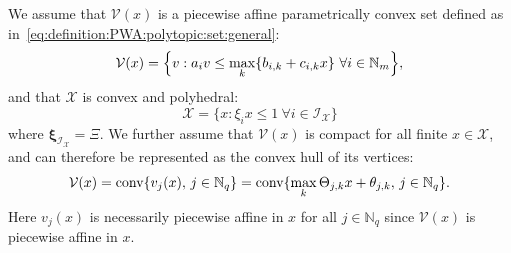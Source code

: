 \documentclass[journal]{IEEEtran}
\newcommand{\todo}[2]{%
  \providetoggle{#1}%
    \iftoggle{#1}{%
    {\color{red}#2}%
    }{#2}%
}
\providecommand{\conv}{\text{conv}}
\theoremstyle{remark}
\theoremstyle{definition}
\begin{document}

We assume that $\mathcal V(x)$ is a piecewise affine parametrically convex 
set defined as in~\eqref{eq:definition:PWA:polytopic:set:general}:
\begin{equation}\label{eq:definition:PWA:polytopic:set:cl}
\mathcal{V}(x) = \Bigl\{ v : a_i v \leq\max_{k} \{ b_{i,k} + c_{i,k} x\} \ \forall i \in\mathbb N_m\Bigr\} ,
\end{equation}
%
and that $\mathcal{X}$ is convex and polyhedral:
\begin{equation}\label{eq:definition:polytopic:X}
\mathcal{X}=\{x : \xi_i x \leq 1\ \forall i \in\mathcal{I}_{\mathcal{X}} \} 
\end{equation}
where $\boldsymbol{\xi}_{\mathcal{I}_{\mathcal{X}}}=\Xi$.
%
We further assume \todo{Manuel:wlog}{(without loss of generality)} that $\mathcal V(x)$ is compact for all finite $x\in\mathcal X$,
and can therefore be represented as the 
convex hull of its vertices: 
\begin{equation}\label{eq:definition:PWA:polytopic:set:vertices}
\mathcal V(x) = \conv\{v_j(x), \, j\in\mathbb{N}_q\} 
=  \conv\{\todo{Manuel:convHull}{\max_{k}}
\Theta_{j\todo{Manuel:convHull}{,k}} x + \theta_{j\todo{Manuel:convHull}{,k}},\, j\in\mathbb{N}_q\}.
\end{equation}
%
Here $v_j(x)$ is necessarily piecewise affine in $x$ for all $j\in\mathbb{N}_q$ since ${\mathcal{V}}(x)$ is piecewise affine in $x$.
%
\end{document}
